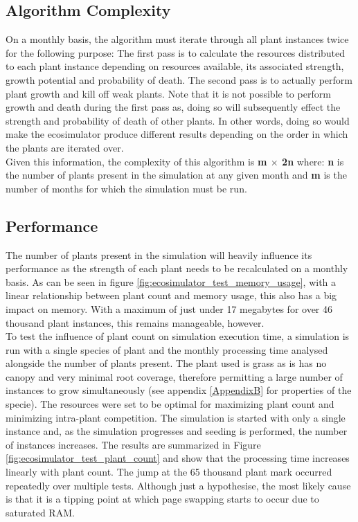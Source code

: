 \subsection{Algorithm Complexity} \label{subsec:ecosystem_algorithm_complexity}

On a monthly basis, the algorithm must iterate through all plant instances twice for the following purpose: The first pass is to calculate the resources distributed to each plant instance depending on resources available, its associated strength, growth potential and probability of death. The second pass is to actually perform plant growth and kill off weak plants. Note that it is not possible to perform growth and death during the first pass as, doing so will subsequently effect the strength and probability of death of other plants. In other words, doing so would make the ecosimulator produce different results depending on the order in which the plants are iterated over.\\
Given this information, the complexity of this algorithm is \textbf{m $\times$ 2n} where: \textbf{n} is the number of plants present in the simulation at any given month and \textbf{m} is the number of months for which the simulation must be run. 

\subsection{Performance} \label{subsec:ecosytem_performance}

The number of plants present in the simulation will heavily influence its performance as the strength of each plant needs to be recalculated on a monthly basis. As can be seen in figure \ref{fig:ecosimulator_test_memory_usage}, with a linear relationship between plant count and memory usage, this also has a big impact on memory. With a maximum of just under 17 megabytes for over 46 thousand plant instances, this remains manageable, however.\\
To test the influence of plant count on simulation execution time, a simulation is run with a single species of plant and the monthly processing time analysed alongside the number of plants present. The plant used is grass as is has no canopy and very minimal root coverage, therefore permitting a large number of instances to grow simultaneously (see appendix \ref{AppendixB} for properties of the specie). The resources were set to be optimal for maximizing plant count and minimizing intra-plant competition. The simulation is started with only a single instance and, as the simulation progresses and seeding is performed, the number of instances increases. The results are summarized in Figure \ref{fig:ecosimulator_test_plant_count} and show that the processing time increases linearly with plant count. The jump at the 65 thousand plant mark occurred repeatedly over multiple tests. Although just a hypothesise, the most likely cause is that it is a tipping point at which page swapping starts to occur due to saturated RAM.\\

